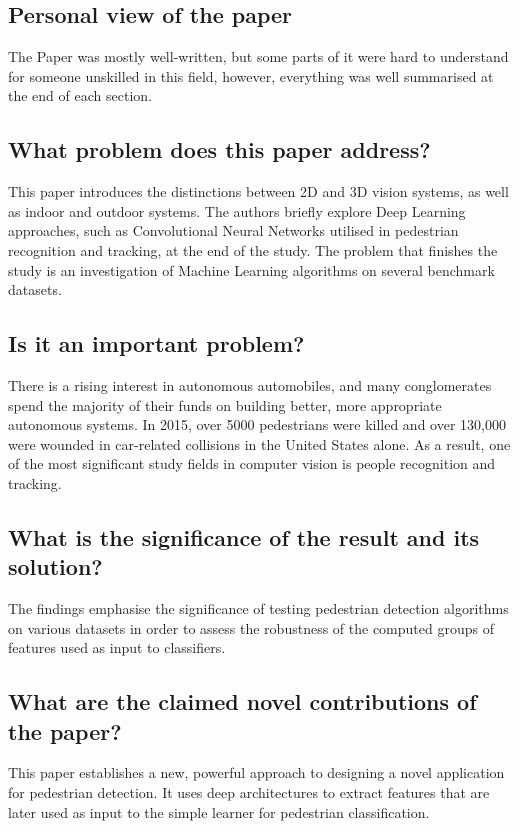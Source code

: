 \documentclass[11pt,a4paper]{article}
\begin{document}
\subsection*{Personal view of the paper}
The Paper was mostly well-written, but some parts of it were hard to understand for someone unskilled in this field, however, everything was well summarised at the end of each section.

\subsection*{What problem does this paper address?}
This paper introduces the distinctions between 2D and 3D vision systems, as well as indoor and outdoor systems. The authors briefly explore Deep Learning approaches, such as Convolutional Neural Networks utilised in pedestrian recognition and tracking, at the end of the study. The problem that finishes the study is an investigation of Machine Learning algorithms on several benchmark datasets.

\subsection*{Is it an important problem?}
There is a rising interest in autonomous automobiles, and many conglomerates spend the majority of their funds on building better, more appropriate autonomous systems. In 2015, over 5000 pedestrians were killed and over 130,000 were wounded in car-related collisions in the United States alone. As a result, one of the most significant study fields in computer vision is people recognition and tracking.

\subsection*{What is the significance of the result and its solution?}
The findings emphasise the significance of testing pedestrian detection algorithms on various datasets in order to assess the robustness of the computed groups of features used as input to classifiers.

\subsection*{What are the claimed novel contributions of the paper?}
This paper establishes a new, powerful approach to designing a novel application for pedestrian detection. It uses deep architectures to extract features that are later used as input to the simple learner for pedestrian classification.
\end{document}
